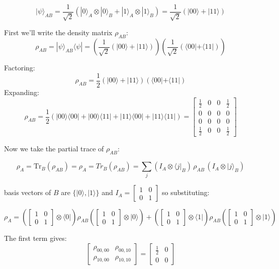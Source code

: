 \[
|\psi\rangle_{AB} = \frac{1}{\sqrt{2}} \left( |0\rangle_A \otimes |0\rangle_B + |1\rangle_A \otimes |1\rangle_B \right)
= \frac{1}{\sqrt{2}} \left( |00\rangle + |11\rangle \right)
\]

\noindent First we'll write the density matrix $\rho_{AB}$:
\[
\rho_{AB} = |\psi\rangle_{AB} \langle \psi|
= \left( \frac{1}{\sqrt{2}} (|00\rangle + |11\rangle) \right)
\left( \frac{1}{\sqrt{2}} (\langle 00| + \langle 11|) \right)
\]

\noindent Factoring:
\[
\rho_{AB} = \frac{1}{2} (|00\rangle + |11\rangle)(\langle 00| + \langle 11|)
\]
\noindent Expanding:
\[
\rho_{AB} = \frac{1}{2} \left(
|00\rangle\langle 00| +
|00\rangle\langle 11| +
|11\rangle\langle 00| +
|11\rangle\langle 11|
\right)
=
\begin{bmatrix}
\frac{1}{2} & 0 & 0 & \frac{1}{2} \\
0 & 0 & 0 & 0 \\
0 & 0 & 0 & 0 \\
\frac{1}{2} & 0 & 0 & \frac{1}{2}
\end{bmatrix}
\]

\noindent Now we take the partial trace of $\rho_{AB}$:

\[
\rho_A = \mathrm{Tr}_B(\rho_{AB}) = \rho_A = Tr_B(\rho_{AB}) = \sum_j (I_A \otimes \langle j|_B) \, \rho_{AB} \, (I_A \otimes |j\rangle_B)
\]


\noindent basis vectors of $B$ are \(
\{ |0\rangle, |1\rangle \}
\)
 and
\(
I_A = \begin{bmatrix}
1 & 0 \\
0 & 1
\end{bmatrix}
\) so substituting:

\[
\rho_A = 
(\begin{bmatrix}
1 & 0 \\
0 & 1
\end{bmatrix} \otimes \langle 0|) \rho_{AB} (\begin{bmatrix}
1 & 0 \\
0 & 1
\end{bmatrix} \otimes |0\rangle) +
(\begin{bmatrix}
1 & 0 \\
0 & 1
\end{bmatrix} \otimes \langle 1|) \rho_{AB} (\begin{bmatrix}
1 & 0 \\
0 & 1
\end{bmatrix} \otimes |1\rangle)
\]


\noindent The first term gives:
\[
\begin{bmatrix}
\rho_{00,00} & \rho_{00,10} \\
\rho_{10,00} & \rho_{10,10}
\end{bmatrix}
=
\begin{bmatrix}
\frac{1}{2} & 0 \\
0 & 0
\end{bmatrix}
\]

